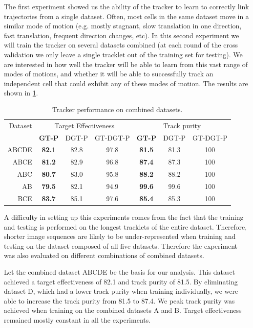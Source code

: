 		The first experiment showed us the ability of the tracker to learn to correctly link trajectories from a single dataset. Often, most cells in the same dataset move in a similar mode of motion (e.g. mostly stagnant, slow translation in one direction, fast translation, frequent direction changes, etc). In this second experiment we will train the tracker on several datasets combined (at each round of the cross validation we only leave a single tracklet out of the training set for testing). We are interested in how well the tracker will be able to learn from this vast range of modes of motions, and whether it will be able to successfully track an independent cell that could exhibit any of these modes of motion. The results are shown in \cref{tab:results_tracker_combined}.
		
		\begin{table}[h]
			\centering
			\begin{tabular}{r*{3}{c}*{3}{c}}
				Dataset & \multicolumn{3}{c}{Target Effectiveness} & \multicolumn{3}{c}{Track purity} \\
				        & \textbf{GT-P} & DGT-P &     GT-DGT-P     & \textbf{GT-P} & DGT-P & GT-DGT-P \\
			\hline
				  ABCDE & \textbf{82.1} & 82.8  &       97.8       & \textbf{81.5} & 81.3  &   100    \\
				   ABCE & \textbf{81.2} & 82.9  &       96.8       & \textbf{87.4} & 87.3  &   100    \\
				    ABC & \textbf{80.7} & 83.0  &       95.8       & \textbf{88.2} & 88.2  &   100    \\
				     AB & \textbf{79.5} & 82.1  &       94.9       & \textbf{99.6} & 99.6  &   100    \\
				    BCE & \textbf{83.7} & 85.1  &       97.6       & \textbf{85.4} & 85.3  &   100
			\end{tabular} 
			\caption{Tracker performance on combined datasets.}
			\label{tab:results_tracker_combined}
		\end{table}

		A difficulty in setting up this experiments comes from the fact that the training and testing is performed on the longest tracklets of the entire dataset. Therefore, shorter image sequences are likely to be under-represented when training and testing on the dataset composed of all five datasets. Therefore the experiment was also evaluated on different combinations of combined datasets. 

		Let the combined dataset ABCDE be the basis for our analysis. This dataset achieved a target effectiveness of 82.1 and track purity of 81.5. By eliminating dataset D, which had a lower track purity when training individually, we were able to increase the track purity from 81.5 to 87.4. We peak track purity was achieved when training on the combined datasets A and B. Target effectiveness remained mostly constant in all the experiments.
		
